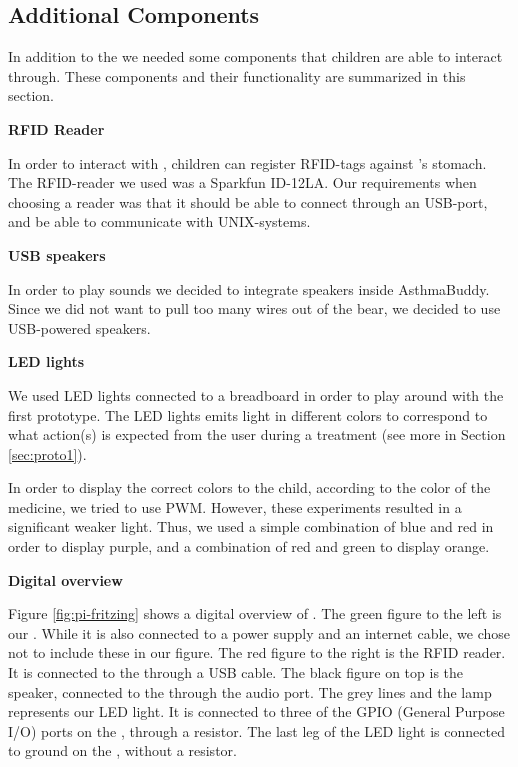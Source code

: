   
\subsection{Additional Components}
\label{sec:additionalcomponents}
In addition to the \rpi{} we needed some components that children are able to interact through. These components and their functionality are summarized in this section. 


\textbf{RFID Reader}

In order to interact with \ab{}, children can register RFID-tags against \ab{}'s stomach. The RFID-reader we used was a Sparkfun ID-12LA. Our requirements when choosing a reader was that it should be able to connect through an USB-port, and be able to communicate with UNIX-systems.
         
\textbf{USB speakers}

In order to play sounds we decided to integrate speakers inside AsthmaBuddy. Since we did not want to pull too many wires out of the bear, we decided to use USB-powered speakers.    

\clearpage{}

\textbf{LED lights}

We used LED lights connected to a breadboard in order to play around with the first prototype. The LED lights emits light in different colors to correspond to what action(s) is expected from the user during a treatment (see more in Section \ref{sec:proto1}). 

In order to display the correct colors to the child, according to the color of the medicine, we tried to use PWM. However, these experiments resulted in a significant weaker light. Thus, we used a simple combination of blue and red in order to display purple, and a combination of red and green to display orange.  

\textbf{Digital overview}
 
Figure \ref{fig:pi-fritzing} shows a digital overview of \buddy{}. The green figure to the left is our \rpi{}. While it is also connected to a power supply and an internet cable, we chose not to include these in our figure. The red figure to the right is the RFID reader. It is connected to the \rpi{} through a USB cable. The black figure on top is the speaker, connected to the \rpi{} through the audio port. 
The grey lines and the lamp represents our LED light. It is connected to three of the GPIO (General Purpose I/O) ports on the \rpi{}, through a resistor. The last leg of the LED light is connected to ground on the \rpi{}, without a resistor.


